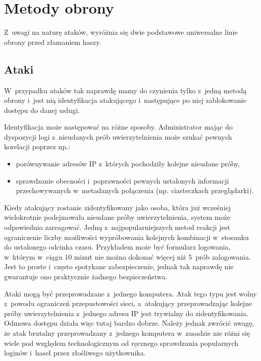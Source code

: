 \section{Metody obrony}

Z~uwagi na naturę ataków, wyróżnia się dwie podstawowe uniwersalne linie obrony
przed złamaniem haszy.

\subsection{Ataki }

W~przypadku ataków  tak naprawdę mamy do czynienia tylko z~jedną
metodą obrony i~jest nią identyfikacja atakującego i~następujące po niej
zablokowanie dostępu do danej usługi.

Identyfikacja może następować na różne sposoby. Administrator mając do
dyspozycji logi z~nieudanych prób uwierzytelnienia może szukać pewnych
korelacji poprzez np.:

\begin{itemize}

\item porównywanie adresów IP z~których pochodziły kolejne nieudane próby,

\item sprawdzanie obecności i~poprawności pewnych ustalonych informacji
przechowywanych w~metadanych połączenia (np. ciasteczkach przeglądarki).

\end{itemize}

Kiedy atakujący zostanie zidentyfikowany jako osoba, która już wcześniej
wielokrotnie podejmowała nieudane próby uwierzytelnienia, system może
odpowiednio zareagować. Jedną z~najpopularniejszych metod reakcji jest
ograniczenie liczby możliwości wypróbowania kolejnych kombinacji w~stosunku do
ustalonego odcinka czasu. Przykładem może być formularz logowania, w~którym
w~ciągu 10 minut nie można dokonać więcej niż 5~prób zalogowania. Jest to
proste i~często spotykane zabezpieczenie, jednak tak naprawdę nie gwarantuje
ono praktycznie żadnego bezpieczeństwa.

Ataki  mogą być przeprowadzane z~jednego komputera. Atak tego typu
jest wolny z~powodu ograniczeń przepustowości sieci, a~atakujący
przeprowadzając kolejne próby uwierzytelnienia z~jednego adresu IP jest
trywialny do zidentyfikowania. Odmowa dostępu działa więc tutaj bardzo dobrze.
Należy jednak zwrócić uwagę, że atak brutalny przeprowadzany z~jednego
komputera w~zasadzie nie różni się wiele pod względem technologicznym od
ręcznego sprawdzania popularnych loginów i~haseł przez złośliwego użytkownika.

